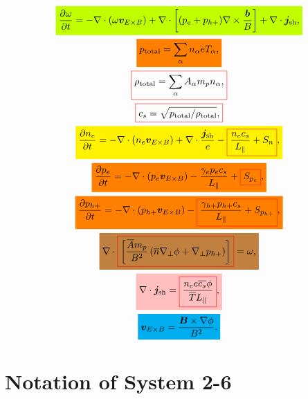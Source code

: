 \documentclass{article}
\makeatletter
\newcommand{\mathcolorbox}[2]{\colorbox{#1}{$\displaystyle #2$}}
\newcommand*{\colorboxed}{}
\def\colorboxed#1#{\colorboxedAux{#1}}
\newcommand*{\colorboxedAux}[3]{
    \begingroup
        \colorlet{cb@saved}{.}
        \color#1{#2}
        \boxed{\color{cb@saved}#3}
    \endgroup
}
\makeatother
\begin{document}
\begin{gather}
    \mathcolorbox{lime}{ \frac{\partial\omega}{\partial t} = - \nabla \cdot (\omega \bm{v}_{E \times B}) + \nabla \cdot \left[ (p_e + p_{h+}) \nabla \times \frac{\bm{b}}{B} \right] + \nabla \cdot \bm{j}_\text{sh} , } \\
    \mathcolorbox{orange}{ p_\text{total} = \sum_\alpha n_\alpha eT_\alpha , } \\
    \colorboxed{red}{ \rho_\text{total} = \sum_\alpha A_\alpha m_p n_\alpha , } \\
    \colorboxed{red}{ c_s = \sqrt{p_\text{total} / \rho_\text{total}} , } \\
    \mathcolorbox{yellow}{ \frac{\partial n_e}{\partial t} = - \nabla \cdot (n_e \bm{v}_{E \times B}) + \nabla \cdot \frac{\bm{j}_\text{sh}}{e} - \colorboxed{red}{ \frac{n_e c_s}{L_\parallel} + S_n } , } \\
    \mathcolorbox{orange}{ \frac{\partial p_e}{\partial t} = - \nabla \cdot (p_e \bm{v}_{E \times B}) - \frac{\gamma_e p_e c_s}{L_\parallel} + \colorboxed{red}{ S_{p_e} } , } \\
    \mathcolorbox{orange}{ \frac{\partial p_{h+}}{\partial t} = - \nabla \cdot (p_{h+} \bm{v}_{E \times B}) - \colorboxed{red}{ \frac{\gamma_{h+} p_{h+} c_s}{L_\parallel} + S_{p_{h+}} } , } \\
    \mathcolorbox{brown}{ \nabla \cdot \colorboxed{red}{ \left[ \frac{\overline{A} m_p}{B^2} \left( \overline{n} \nabla_\perp \phi + \nabla_\perp p_{h+} \right) \right] } = \omega , } \\
    \mathcolorbox{pink}{ \nabla \cdot \bm{j}_\text{sh} = \colorboxed{red}{ \frac{n_e e \overline{c_s} \phi}{\overline{T} L_\parallel} } , } \\
    \mathcolorbox{cyan}{ \bm{v}_{E \times B} = \frac{\bm{B} \times \nabla \phi}{B^2} . }
\end{gather}

\section{Notation of System 2-6}
\end{document}
